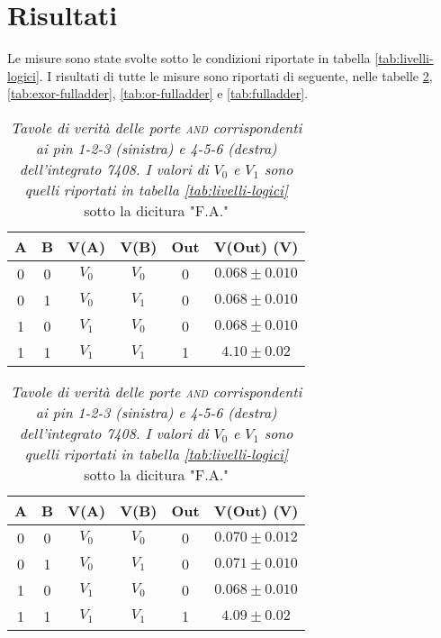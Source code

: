 \section{Risultati}\label{sec:risultati}
Le misure sono state svolte sotto le condizioni riportate in tabella \ref{tab:livelli-logici}.
I risultati di tutte le misure sono riportati di seguente, nelle tabelle
\ref{tab:and-fulladder}, \ref{tab:exor-fulladder}, \ref{tab:or-fulladder} e \ref{tab:fulladder}.

\begin{table}[H]
  \centering
  \begin{subtable}[H]{0.5\textwidth}
    \centering
    \begin{tabular}[t]{c  c | c  c | c  c}
      \hline
      A & B & V(A) & V(B) & Out & V(Out) (V)\\
      \hline
      0 & 0 & $V_{0}$ & $V_{0}$ & 0 & $0.068 \pm 0.010$ \\
      0 & 1 & $V_{0}$ & $V_{1}$ & 0 & $0.068 \pm 0.010$ \\
      1 & 0 & $V_{1}$ & $V_{0}$ & 0 & $0.068 \pm 0.010$ \\
      1 & 1 & $V_{1}$ & $V_{1}$ & 1 & $4.10 \pm 0.02$ \\
      \hline
    \end{tabular}
  \end{subtable}

  \vspace{.5cm}

  \begin{subtable}[H]{0.5\textwidth}
    \centering
    \begin{tabular}[t]{c  c | c  c | c  c}
      \hline
      A & B & V(A) & V(B) & Out & V(Out) (V)\\
      \hline
      0 & 0 & $V_{0}$ & $V_{0}$ & 0 & $0.070 \pm 0.012$ \\
      0 & 1 & $V_{0}$ & $V_{1}$ & 0 & $0.071 \pm 0.010$ \\
      1 & 0 & $V_{1}$ & $V_{0}$ & 0 & $0.068 \pm 0.010$ \\
      1 & 1 & $V_{1}$ & $V_{1}$ & 1 & $4.09 \pm 0.02$ \\
      \hline
    \end{tabular}
  \end{subtable}
  \caption{\emph{Tavole di verità delle porte \textsc{and} corrispondenti ai pin 1-2-3 (sinistra) e 4-5-6 (destra) dell'integrato 7408. I valori di $V_{0}$ e $V_{1}$ sono quelli riportati in tabella \ref{tab:livelli-logici}} sotto la dicitura "F.A."}
  \label{tab:and-fulladder}
\end{table}

